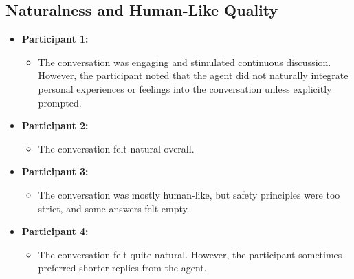 \documentclass{article}
\begin{document}
\subsection{Naturalness and Human-Like Quality}
\begin{itemize}
    \item \textbf{Participant 1:}
    \begin{itemize}
        \item The conversation was engaging and stimulated continuous discussion. However, the participant noted that the agent did not naturally integrate personal experiences or feelings into the conversation unless explicitly prompted.
    \end{itemize}
    \item \textbf{Participant 2:}
    \begin{itemize}
        \item The conversation felt natural overall.
    \end{itemize}
    \item \textbf{Participant 3:}
    \begin{itemize}
        \item The conversation was mostly human-like, but safety principles were too strict, and some answers felt empty.
    \end{itemize}
    \item \textbf{Participant 4:}
    \begin{itemize}
        \item The conversation felt quite natural. However, the participant sometimes preferred shorter replies from the agent.
    \end{itemize}
\end{itemize}
\end{document}
